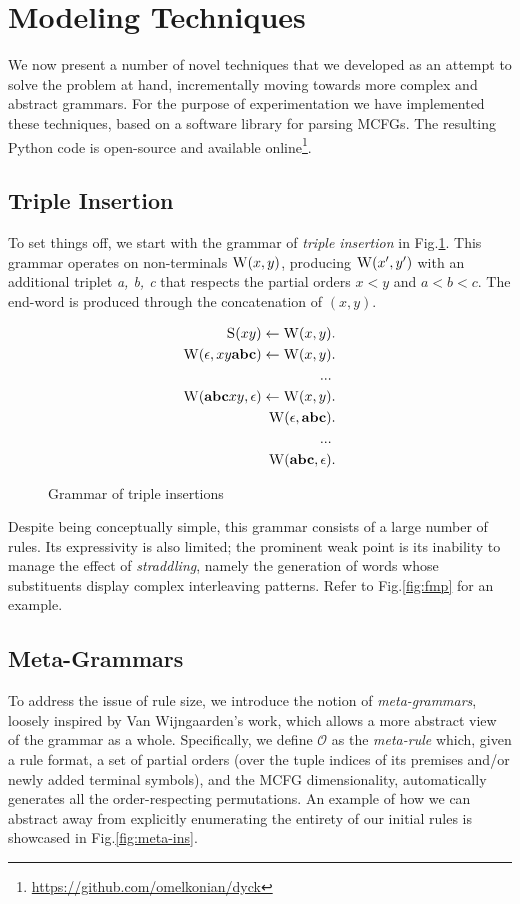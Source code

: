 \documentclass[nonatbib,numbers,10pt]{llncs}
\newcommand\s{\textsc}
\begin{document}
\section{Modeling Techniques}\label{sec2}
We now present a number of novel techniques that we developed as an attempt to solve the problem at hand, incrementally moving towards more complex and abstract grammars. For the purpose of experimentation we have implemented these techniques, based on a software library for parsing MCFGs\cite{ljunglof}. The resulting Python code is open-source and available online\footnote{\url{https://github.com/omelkonian/dyck}}.

\subsection{Triple Insertion}
To set things off, we start with the grammar of \textit{triple insertion} in Fig.\ref{fig:ins}. This grammar operates on non-terminals $\s{W}(x,y)$, producing $\s{W}(x',y')$ with an additional triplet \textit{a, b, c} that respects the partial orders $x<y$ and $a<b<c$. The end-word is produced through the concatenation of $(x,y)$.

\begin{figure}
  \centering
  \begin{align}
	\setcounter{equation}{0}
	\s{S}(xy) \leftarrow \s{W}(x,y)&. \\
	\s{W}(\epsilon, xy\textbf{abc}) \leftarrow \s{W}(x,y)&. \\
	... \nonumber \\
	\setcounter{equation}{60}
	\s{W}(\textbf{abc}xy, \epsilon) \leftarrow \s{W}(x,y)&. \\
	\s{W}(\epsilon, \textbf{abc})&. \\
	... \nonumber \\
	\setcounter{equation}{64}
	\s{W}(\textbf{abc}, \epsilon)&.
	\end{align}
  \caption{Grammar of triple insertions}  
  \label{fig:ins}
\end{figure}

Despite being conceptually simple, this grammar consists of a large number of rules. Its expressivity is also limited; the prominent weak point is its inability to manage the effect of \textit{straddling}, namely the generation of words whose substituents display complex interleaving patterns. Refer to Fig.\ref{fig:fmp} for an example.
\subsection{Meta-Grammars}\label{subsec22}
To address the issue of rule size, we introduce the notion of \textit{meta-grammars}, loosely inspired by Van Wijngaarden's work\cite{vanwijn}, which allows a more abstract view of the grammar as a whole. Specifically, we define $\mathcal{O}$ as the \textit{meta-rule} which, given a rule format, a set of partial orders (over the tuple indices of its premises and/or newly added terminal symbols), and the MCFG dimensionality, automatically generates all the order-respecting permutations. An example of how we can abstract away from explicitly enumerating the entirety of our initial rules is showcased in Fig.\ref{fig:meta-ins}.
\end{document}
